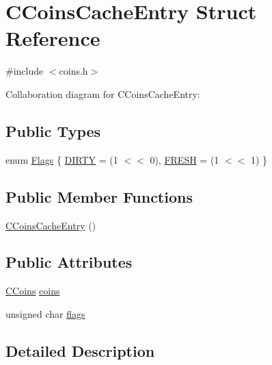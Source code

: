 \hypertarget{struct_c_coins_cache_entry}{}\section{C\+Coins\+Cache\+Entry Struct Reference}
\label{struct_c_coins_cache_entry}


{\ttfamily \#include $<$coins.\+h$>$}



Collaboration diagram for C\+Coins\+Cache\+Entry\+:
\subsection*{Public Types}
\begin{DoxyCompactItemize}
\item 
enum \hyperlink{struct_c_coins_cache_entry_a1d5ac74da0f6ff5ab056e47ce79753c7}{Flags} \{ \hyperlink{struct_c_coins_cache_entry_a1d5ac74da0f6ff5ab056e47ce79753c7ac8cbd1b21d937e8618f9fecdf2c7223e}{D\+I\+R\+T\+Y} = (1 $<$$<$ 0), 
\hyperlink{struct_c_coins_cache_entry_a1d5ac74da0f6ff5ab056e47ce79753c7aae43958b088ff7b6e4f0daaafff00816}{F\+R\+E\+S\+H} = (1 $<$$<$ 1)
 \}
\end{DoxyCompactItemize}
\subsection*{Public Member Functions}
\begin{DoxyCompactItemize}
\item 
\hyperlink{struct_c_coins_cache_entry_ad241b5b23552ba45c0372b71f73d0f25}{C\+Coins\+Cache\+Entry} ()
\end{DoxyCompactItemize}
\subsection*{Public Attributes}
\begin{DoxyCompactItemize}
\item 
\hyperlink{class_c_coins}{C\+Coins} \hyperlink{struct_c_coins_cache_entry_a343585f1fcb810f9c21fc25ae42a1eba}{coins}
\item 
unsigned char \hyperlink{struct_c_coins_cache_entry_a05225c349f51777385e3a1c9b0eeaaed}{flags}
\end{DoxyCompactItemize}


\subsection{Detailed Description}


